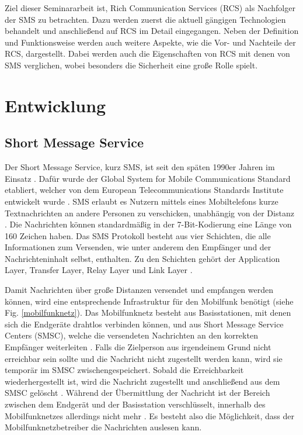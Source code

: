 \documentclass[conference]{IEEEtran}
\begin{document}
Ziel dieser Seminararbeit ist, Rich Communication Services (RCS) als Nachfolger der SMS zu betrachten.
Dazu werden zuerst die aktuell gängigen Technologien behandelt und anschließend auf RCS im Detail eingegangen.
Neben der Definition und Funktionsweise werden auch weitere Aspekte, wie die Vor- und Nachteile der RCS, dargestellt.
Dabei werden auch die Eigenschaften von RCS mit denen von SMS verglichen, wobei besonders die Sicherheit eine große Rolle spielt.

\section{Entwicklung}

\subsection{Short Message Service}

Der Short Message Service, kurz SMS, ist seit den späten 1990er Jahren im Einsatz \cite{sendoutsms}.
Dafür wurde der Global System for Mobile Communications Standard etabliert, welcher von dem European Telecommunications Standards Institute entwickelt wurde \cite{smshow}.
SMS erlaubt es Nutzern mittels eines Mobiltelefons kurze Textnachrichten an andere Personen zu verschicken, unabhängig von der Distanz \cite{sendoutsms}.
Die Nachrichten können standardmäßig in der 7-Bit-Kodierung eine Länge von 160 Zeichen haben.
Das SMS Protokoll besteht aus vier Schichten, die alle Informationen zum Versenden, wie unter anderem den Empfänger und der Nachrichteninhalt selbst, enthalten.
Zu den Schichten gehört der Application Layer, Transfer Layer, Relay Layer und Link Layer \cite{smshow}.

Damit Nachrichten über große Distanzen versendet und empfangen werden können, wird eine entsprechende Infrastruktur für den Mobilfunk benötigt (siehe Fig. \ref{mobilfunknetz}).
Das Mobilfunknetz besteht aus Basisstationen, mit denen sich die Endgeräte drahtlos verbinden können, und aus Short Message Service Centers (SMSC), welche die versendeten Nachrichten an den korrekten Empfänger weiterleiten \cite{sendoutsms}.
Falls die Zielperson aus irgendeinem Grund nicht erreichbar sein sollte und die Nachricht nicht zugestellt werden kann, wird sie temporär im SMSC zwischengespeichert. Sobald die Erreichbarkeit wiederhergestellt ist, wird die Nachricht zugestellt und anschließend aus dem SMSC gelöscht \cite{smshow}.
Während der Übermittlung der Nachricht ist der Bereich zwischen dem Endgerät und der Basisstation verschlüsselt, innerhalb des Mobilfunknetzes allerdings nicht mehr \cite{sendoutsms}. Es besteht also die Möglichkeit, dass der Mobilfunknetzbetreiber die Nachrichten auslesen kann.
\end{document}
